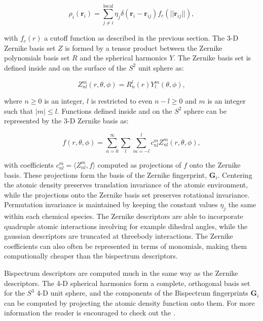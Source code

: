 \begin{equation}
 \rho_i(\bm{r}_i) = \sum_{j\neq i}^{\text{local}}
    \eta_j \delta \left( \bm{r}_i - \bm{r}_{ij} \right)
    f_c \left( \lvert \lvert \bm{r}_{ij} \rvert \rvert \right) , 
\end{equation}

with $f_c(r)$ a cutoff function as described in the previous section.
The 3-D Zernike basis set $Z$ is formed by a tensor product between
the Zernike polynomials basis set $R$ and the spherical harmonics
$Y$. The Zernike basis set is defined inside and on the surface
of the $S^2$ unit sphere as:

\begin{equation}
 Z_{nl}^m (r, \theta, \phi) = R_n^l(r) Y_l^m(\theta, \phi) , 
\end{equation}

where $n \geq 0$ is an integer, $l$ is restricted to even $n - l \geq 0$
and $m$ is an integer such that $\left| m \right| \leq l$.
Functions defined inside and on the $S^2$ sphere
can be represented by the 3-D Zernike basis as:

\begin{equation}
 f(r, \theta, \phi) = \sum_{n=0}^{\infty} \sum_l \sum_{m=-l}^l
    c_{nl}^m Z_{nl}^m (r, \theta, \phi) , 
\end{equation}

with coefficients $c_{nl}^m = \langle Z_{nl}^m, f \rangle$
computed as projections of $f$ onto the Zernike basis.
These projections form the basis of the Zernike fingerprint,
$\bm{G}_i$. Centering the atomic density preserves translation
invariance of the atomic environment, while the projections
onto the Zernike basis set preserves rotational invariance.
Permutation invariance is maintained by keeping the constant values
$\eta_j$ the same within each chemical species.
The Zernike descriptors are able to incorporate quadruple
atomic interactions involving for example dihedral angles,
while the gaussian descriptors are truncated at threebody
interactions. The Zernike coefficients can also often be represented
in terms of monomials, making them computionally cheaper
than the bispectrum descriptors.
\par
Bispectrum descriptors are computed much in the same way
as the Zernike descriptors. The 4-D spherical harmonics
form a complete, orthogonal basis set for the $S^3$ 4-D unit
sphere, and the components of the Bispectrum fingerprints
$\bm{G}_i$ can be computed by projecting the atomic
density function onto them. For more information
the reader is encouraged to check out the \parencite[AMP paper]
{khorshidi2016amp}.

